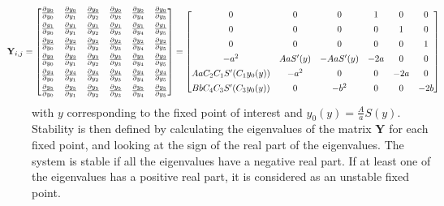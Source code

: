 \documentclass[12pt,twoside]{article}
\begin{document}
\[
\hspace{-1cm}
\mathbf{Y}_{i,j} =
\begin{bmatrix}
  \frac{\partial y_0}{\partial y_0} & 
    \frac{\partial y_0}{\partial y_1} & 
    \frac{\partial y_0}{\partial y_2} &
    \frac{\partial y_0}{\partial y_3} &
    \frac{\partial y_0}{\partial y_4} &
    \frac{\partial y_0}{\partial y_5 } \\[1ex] %
  \frac{\partial y_1}{\partial y_0} & 
    \frac{\partial y_1}{\partial y_1} & 
    \frac{\partial y_1}{\partial y_2} &
    \frac{\partial y_1}{\partial y_3} &
    \frac{\partial y_1}{\partial y_4} &
    \frac{\partial y_1}{\partial y_5 } \\[1ex]
  \frac{\partial y_2}{\partial y_0} & 
    \frac{\partial y_2}{\partial y_1} & 
    \frac{\partial y_2}{\partial y_2} &
    \frac{\partial y_2}{\partial y_3} &
    \frac{\partial y_2}{\partial y_4} &
    \frac{\partial y_2}{\partial y_5 } \\[1ex]
  \frac{\partial y_3}{\partial y_0} & 
    \frac{\partial y_3}{\partial y_1} & 
    \frac{\partial y_3}{\partial y_2} &
    \frac{\partial y_3}{\partial y_3} &
    \frac{\partial y_3}{\partial y_4} &
    \frac{\partial y_3}{\partial y_5 } \\[1ex] 
  \frac{\partial y_4}{\partial y_0} & 
    \frac{\partial y_4}{\partial y_1} & 
    \frac{\partial y_4}{\partial y_2} &
    \frac{\partial y_4}{\partial y_3} &
    \frac{\partial y_4}{\partial y_4} &
    \frac{\partial y_4}{\partial y_5 } \\[1ex]
  \frac{\partial y_5}{\partial y_0} & 
    \frac{\partial y_5}{\partial y_1} & 
    \frac{\partial y_5}{\partial y_2} &
    \frac{\partial y_5}{\partial y_3} &
    \frac{\partial y_5}{\partial y_4} &
    \frac{\partial y_5}{\partial y_5 } 
\end{bmatrix}
= 
\begin{bmatrix}
  0 & 
    0 & 
    0 &
    1 &
    0 &
    0 \\[1ex] %
  0 & 
    0 & 
    0 &
    0 &
    1 &
    0 \\[1ex]
  0 & 
    0 & 
    0 &
    0 &
    0 &
    1 \\[1ex]
  -a^2 & 
    AaS'(y) & 
    -AaS'(y) &
    -2a &
    0 &
    0 \\[1ex]
  AaC_{2}C_{1}S'(C_{1}y_0(y)) & 
    -a^2 & 
    0 &
    0 &
    -2a &
    0 \\[1ex]
  BbC_{4}C_{3}S'(C_{3}y_0(y)) & 
    0 & 
    -b^2 &
    0 &
    0 &
    -2b
\end{bmatrix}
\]
with $y$ corresponding to the fixed point of interest and $y_0(y) = \frac{A}{a}S(y)$. Stability is then defined by calculating the eigenvalues of the matrix $\mathbf{Y}$ for each fixed point, and looking at the sign of the real part of the eigenvalues. The system is stable if all the eigenvalues have a negative real part. If at least one of the eigenvalues has a positive real part, it is considered as an unstable fixed point. 
\end{document}
